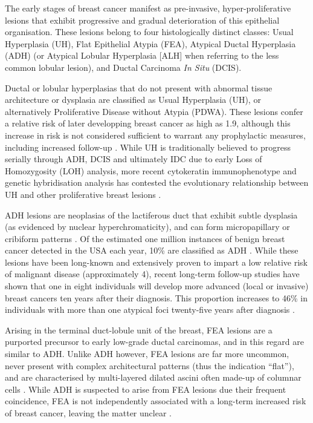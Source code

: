 The early stages of breast cancer manifest as pre-invasive, hyper-proliferative lesions that exhibit progressive and gradual deterioration of this epithelial organisation. These lesions belong to four histologically distinct classes: Usual Hyperplasia (UH), Flat Epithelial Atypia (FEA), Atypical Ductal Hyperplasia (ADH) (or Atypical Lobular Hyperplasia [ALH] when referring to the less common lobular lesion), and Ductal Carcinoma {\it In Situ} (DCIS).\par

Ductal or lobular hyperplasias that do not present with abnormal tissue architecture or dysplasia are classified as Usual Hyperplasia (UH), or alternatively Proliferative Disease without Atypia (PDWA). These lesions confer a relative risk of later developping breast cancer as high as 1.9, although this increase in risk is not considered sufficient to warrant any prophylactic measures, including increased follow-up \citep{mommers2001}. While UH is traditionally believed to progress serially through ADH, DCIS and ultimately IDC due to early Loss of Homozygosity (LOH) analysis, more recent cytokeratin immunophenotype and genetic hybridisation analysis has contested the evolutionary relationship between UH and other proliferative breast lesions \citep{oconnell1994, boecker2002}.\par

ADH lesions are neoplasias of the lactiferous duct that exhibit subtle dysplasia (as evidenced by nuclear hyperchromaticity), and can form micropapillary or cribiform patterns \citep{page1959,dion2016}. Of the estimated one million instances of benign breast cancer detected in the USA each  year, 10\% are classified as ADH \citep{simpson2009}. While  these lesions have been long-known and extensively proven to impart a low relative risk of malignant disease (approximately 4), recent long-term follow-up studies have shown that one in eight individuals will develop more advanced (local or invasive) breast cancers ten years after their diagnosis. This proportion increases to 46\% in individuals with more than one atypical foci twenty-five years after diagnosis \citep{hartmann2015}.\par

Arising in the terminal duct-lobule unit of the breast, FEA lesions are a purported precursor to early low-grade ductal carcinomas, and in this regard are similar to ADH. Unlike ADH however, FEA lesions are far more uncommon, never present with complex architectural patterns (thus the indication ``flat''), and are characterised by multi-layered dilated ascini often made-up of columnar cells \citep{pinder2017}. While ADH is suspected to arise from FEA lesions due their frequent coincidence, FEA is not independently associated with a long-term increased risk of breast cancer, leaving the matter unclear \citep{bombonati2011,lerwill2008,acott2016}.

